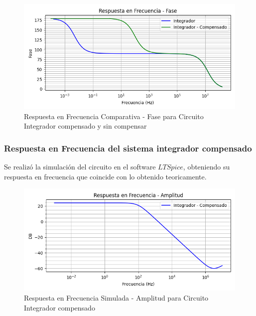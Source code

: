 \begin{figure}[H]
    \centering 
    \includegraphics [scale=1] {../Ejercicio3-CircuitoIntegradoresyDerivadores/Imagenes/diagrama-bode-integrador-compensado-comparativo-fase.png} 
    \caption{Respuesta en Frecuencia Comparativa - Fase para Circuito Integrador compensado y sin compensar }
    \label{fig:emptyPlotTool}
\end{figure}

\subsubsection{Respuesta en Frecuencia del sistema integrador compensado}

Se realizó la simulación del circuito en el software $LTSpice$, obteniendo su respuesta en frecuencia que coincide con lo obtenido teoricamente.

\begin{figure}[H]
    \centering 
    \includegraphics [scale=1] {../Ejercicio3-CircuitoIntegradoresyDerivadores/Imagenes/diagrama-bode-integrador-simulado-compensado-amplitud.png} 
    \caption{Respuesta en Frecuencia Simulada - Amplitud para Circuito Integrador compensado}
    \label{fig:emptyPlotTool}
\end{figure}

